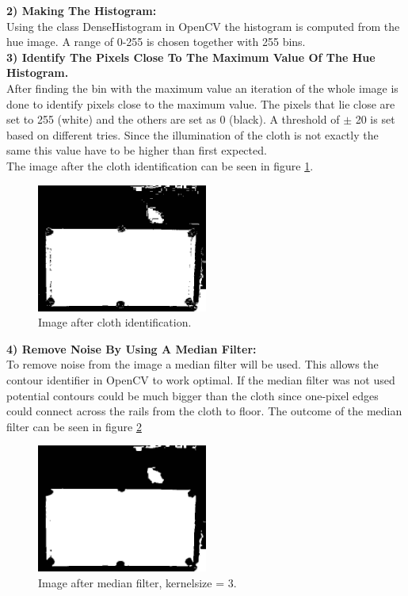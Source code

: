 \textbf{2) Making The Histogram:}\\
Using the class DenseHistogram in OpenCV the histogram is computed from the hue image. A range of 0-255 is chosen together with 255 bins.\\

\textbf{3) Identify The Pixels Close To The Maximum Value Of The Hue Histogram.}\\
After finding the bin with the maximum value an iteration of the whole image is done to identify pixels close to the maximum value. The pixels that lie close are set to 255 (white) and the others are set as 0 (black). A threshold of $\pm$ 20 is set based on different tries. Since the illumination of the cloth is not exactly the same this value have to be higher than first expected.\\

The image after the cloth identification can be seen in figure \ref{fig:aftercloth}.

\begin{figure}[H]
\begin{center}
\leavevmode
\includegraphics[width=0.5\textwidth]{images/aftercloth}
\end{center}
\caption{Image after cloth identification.}
\label{fig:aftercloth}
\end{figure}

\textbf{4) Remove Noise By Using A Median Filter:}\\
To remove noise from the image a median filter will be used. This allows the contour identifier in OpenCV to work optimal. If the median filter was not used potential contours could be much bigger than the cloth since one-pixel edges could connect across the rails from the cloth to floor. The outcome of the median filter can be seen in figure \ref{fig:afterclothmedian}

\begin{figure}[H]
\begin{center}
\leavevmode
\includegraphics[width=0.5\textwidth]{images/afterclothmedian}
\end{center}
\caption{Image after median filter, kernelsize = 3.}
\label{fig:afterclothmedian}
\end{figure}

